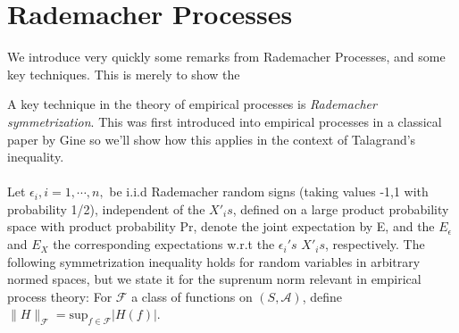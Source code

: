 \documentclass[12pt, oneside, a4paper]{article}
\theoremstyle{plain}
\theoremstyle{definition}
\begin{document}
\section{Rademacher Processes}\label{sec:Rademacher}
We introduce very quickly some remarks from Rademacher Processes,
and some key techniques. This is merely to show the 

A key technique in the theory of empirical processes is \textit{Rademacher symmetrization}. 
This was first introduced into empirical processes in a classical paper by Gine \cite{Gine1984}
so we'll show how this applies in the context of Talagrand's inequality\cite{Talagrand95,TalagrandInequality}. 
\paragraph{} Let $\epsilon_i,i=1,\cdots,n,$ be i.i.d Rademacher random signs (taking values -1,1 with probability 1/2), independent of the $X'_{i}s$, defined on a large product probability space with product probability Pr, denote the joint expectation by E, and the $E_{\epsilon}$ and $E_{X}$ the corresponding expectations w.r.t the $\epsilon_i 's$ $X'_{i}s$,
respectively. The following symmetrization inequality holds for random variables in arbitrary normed spaces, but we state it for the suprenum norm relevant in empirical process theory: For $\mathcal{F}$ a class of functions on $(S,\mathcal{A})$, define $\|
H\|_{\mathcal{F}} = \mathrm{sup}_{f \in \mathcal{F}} |H(f)|$.
\end{document}
